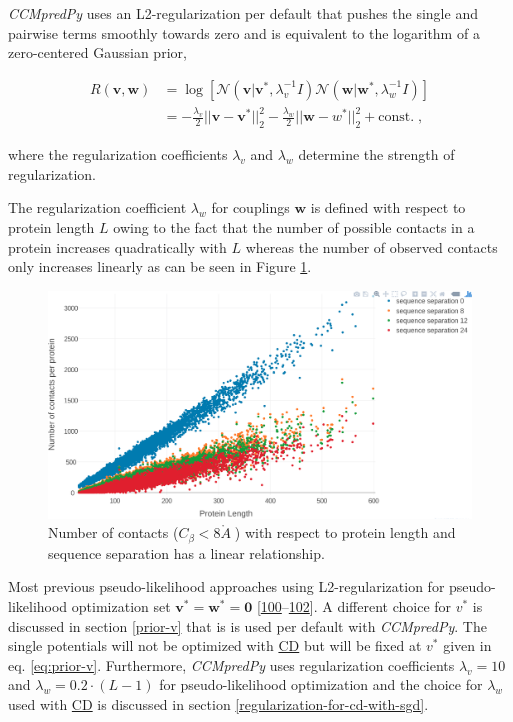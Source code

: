 \documentclass[11pt,a4paper,twoside]{book}
\newcommand{\Cb}{C_\beta}
\newcommand{\eq}{\!=\!}
\renewcommand{\v}{\mathbf{v}}
\newcommand{\w}{\mathbf{w}}
\newcommand{\angstrom}{\mathring{A} \;}
\theoremstyle{definition}
\theoremstyle{definition}
\theoremstyle{remark}
\begin{document}
\emph{CCMpredPy} uses an L2-regularization per default that pushes the
single and pairwise terms smoothly towards zero and is equivalent to the
logarithm of a zero-centered Gaussian prior,

\begin{align}
  R(\v, \w)  &= \log \left[ \mathcal{N}(\v | \v^*, \lambda_v^{-1} I) \mathcal{N}(\w | \w^*, \lambda_w^{-1} I) \right] \nonumber \\
             &= -\frac{\lambda_v}{2} ||\v-\v^*||_2^2 - \frac{\lambda_w}{2} ||\w-w^*||_2^2 + \text{const.} \; ,
\label{eq:l2-reg}
\end{align}

where the regularization coefficients \(\lambda_v\) and \(\lambda_w\)
determine the strength of regularization.

The regularization coefficient \(\lambda_w\) for couplings \(\w\) is
defined with respect to protein length \(L\) owing to the fact that the
number of possible contacts in a protein increases quadratically with
\(L\) whereas the number of observed contacts only increases linearly as
can be seen in Figure \ref{fig:number-contacts-against-L}.





\begin{figure}

{\centering \includegraphics[width=0.9\linewidth]{img/full_likelihood/no_contacts_vs_protein_length_thr8} 

}

\caption{Number of contacts
(\(\Cb < 8 \angstrom\)) with respect to protein length and sequence
separation has a linear relationship.}\label{fig:number-contacts-against-L}
\end{figure}

Most previous pseudo-likelihood approaches using L2-regularization for
pseudo-likelihood optimization set \(\v^* \eq \w^* \eq \mathbf{0}\)
{[}\protect\hyperlink{ref-Seemayer2014}{100}--\protect\hyperlink{ref-Kamisetty2013}{102}{]}.
A different choice for \(v^*\) is discussed in section \ref{prior-v}
that is is used per default with \emph{CCMpredPy}. The single potentials
will not be optimized with \protect\hyperlink{abbrev}{CD} but will be
fixed at \(v^*\) given in eq. \eqref{eq:prior-v}. Furthermore,
\emph{CCMpredPy} uses regularization coefficients \(\lambda_v \eq 10\)
and \(\lambda_w \eq 0.2\cdot(L-1)\) for pseudo-likelihood optimization
and the choice for \(\lambda_w\) used with
\protect\hyperlink{abbrev}{CD} is discussed in section
\ref{regularization-for-cd-with-sgd}.
\end{document}
